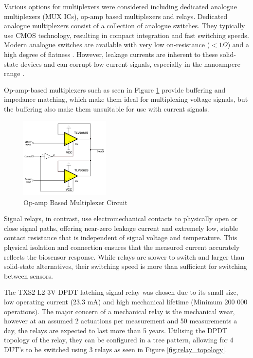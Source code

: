 Various options for multiplexers were considered including dedicated analogue multiplexers (MUX ICs), op-amp based multiplexers and relays. Dedicated analogue multiplexers consist of a collection of analogue switches. They typically use CMOS technology, resulting in compact integration and fast switching speeds. Modern analogue switches are available with very low on-resistance ($<1\Omega$) and a high degree of flatness \cite{SelectingRightCMOS}. However, leakage currents are inherent to these solid-state devices and can corrupt low-current signals, especially in the nanoampere range \cite{SelectingRightCMOS}. 

Op-amp-based multiplexers such as seen in Figure \ref{fig:opamp_mux} provide buffering and impedance matching, which make them ideal for multiplexing voltage signals, but the buffering also make them unsuitable for use with current signals.

\begin{figure}[H]
    \centering
    \includegraphics[width=0.4\textwidth]{OpAmpMux.png}
    \caption[Op-amp Based Multiplexer Circuit]{Op-amp Based Multiplexer Circuit \cite{Sboa311a}}
    \label{fig:opamp_mux}
\end{figure}

Signal relays, in contrast, use electromechanical contacts to physically open or close signal paths, offering near-zero leakage current and extremely low, stable contact resistance that is independent of signal voltage and temperature. This physical isolation and connection ensures that the measured current accurately reflects the biosensor response. While relays are slower to switch and larger than solid-state alternatives, their switching speed is more than sufficient for switching between sensors.

The TXS2-L2-3V DPDT latching signal relay was chosen due to its small size, low operating current (23.3 mA) and high mechanical lifetime (Minimum 200 000 operations). The major concern of a mechanical relay is the mechanical wear, however at an assumed 2 actuations per measurement and 50 measurements a day, the relays are expected to last more than 5 years. Utilising the DPDT topology of the relay, they can be configured in a tree pattern, allowing for 4 DUT's to be switched using 3 relays as seen in Figure \ref{fig:relay_topology}. 

